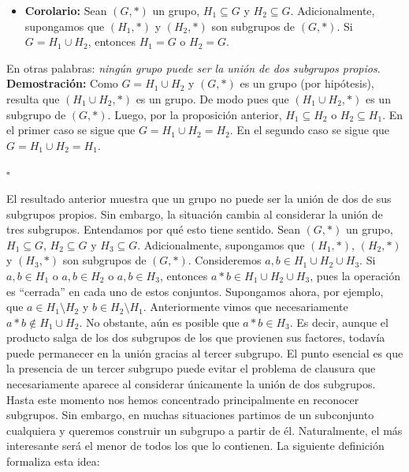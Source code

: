 \documentclass[10 pt]{article}
\begin{document}
\begin{itemize}
    \item \Large{\textbf{Corolario:} Sean $(G,*)$ un grupo, $H_1 \subseteq G$ y $H_2 \subseteq G$. Adicionalmente, supongamos que $(H_1,*)$ y $(H_2,*)$ son subgrupos de $(G,*)$. Si $G=H_1 \cup H_2$, entonces $H_1=G$ o $H_2=G$.} \\
\end{itemize}

\Large{En otras palabras: \textit{ningún grupo puede ser la unión de dos subgrupos propios}.} \\

\Large{\textbf{Demostración:} Como $G=H_1 \cup H_2$ y $(G,*)$ es un grupo (por hipótesis), resulta que $(H_1 \cup H_2,*)$ es un grupo. De modo pues que $(H_1 \cup H_2,*)$ es un subgrupo de $(G,*)$. Luego, por la proposición anterior, $H_1 \subseteq H_2$ o $H_2 \subseteq H_1$. En el primer caso se sigue que $G=H_1 \cup H_2=H_2$. En el segundo caso se sigue que $G=H_1 \cup H_2=H_1$.} \\

\begin{flushright}
    $\square$
\end{flushright}

\Large{El resultado anterior muestra que un grupo no puede ser la unión de dos de sus subgrupos propios. Sin embargo, la situación cambia al considerar la unión de tres subgrupos. Entendamos por qué esto tiene sentido. Sean $(G,*)$ un grupo, $H_1 \subseteq G$, $H_2 \subseteq G$ y $H_3 \subseteq G$. Adicionalmente, supongamos que $(H_1,*)$, $(H_2,*)$ y $(H_3,*)$ son subgrupos de $(G,*)$. Consideremos $a,b\in H_1\cup H_2\cup H_3$. Si $a,b\in H_1$ o $a,b\in H_2$ o $a,b\in H_3$, entonces $a*b\in H_1\cup H_2\cup H_3$, pues la operación es ``cerrada'' en cada uno de estos conjuntos. Supongamos ahora, por ejemplo, que $a\in H_1\setminus H_2$ y $b\in H_2\setminus H_1$. Anteriormente vimos que necesariamente $a*b\notin H_1\cup H_2$. No obstante, aún es posible que $a*b\in H_3$. Es decir, aunque el producto salga de los dos subgrupos de los que provienen sus factores, todavía puede permanecer en la unión gracias al tercer subgrupo. El punto esencial es que la presencia de un tercer subgrupo puede evitar el problema de clausura que necesariamente aparece al considerar únicamente la unión de dos subgrupos.} \\

\Large{Hasta este momento nos hemos concentrado principalmente en reconocer subgrupos. Sin embargo, en muchas situaciones partimos de un subconjunto cualquiera y queremos construir un subgrupo a partir de él. Naturalmente, el más interesante será el menor de todos los que lo contienen. La siguiente definición formaliza esta idea:} \\
\end{document}
